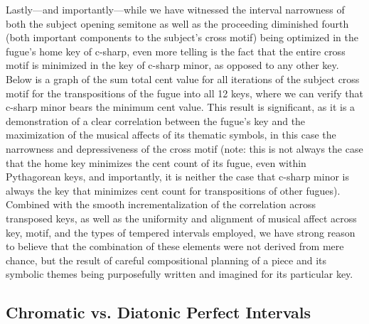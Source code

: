 Lastly---and importantly---while we have witnessed the interval
narrowness of both the subject opening semitone as well as the
proceeding diminished fourth (both important components to the subject's
cross motif) being optimized in the fugue's home key of c-sharp, even
more telling is the fact that the entire cross motif is minimized in the
key of c-sharp minor, as opposed to any other key. Below is a graph of
the sum total cent value for all iterations of the subject cross motif
for the transpositions of the fugue into all 12 keys, where we can
verify that c-sharp minor bears the minimum cent value. This result is
significant, as it is a demonstration of a clear correlation between the
fugue's key and the maximization of the musical affects of its thematic
symbols, in this case the narrowness and depressiveness of the cross
motif (note: this is not always the case that the home key minimizes the
cent count of its fugue, even within Pythagorean keys, and importantly,
it is neither the case that c-sharp minor is always the key that
minimizes cent count for transpositions of other fugues). Combined with
the smooth incrementalization of the correlation across transposed keys,
as well as the uniformity and alignment of musical affect across key,
motif, and the types of tempered intervals employed, we have strong
reason to believe that the combination of these elements were not
derived from mere chance, but the result of careful compositional
planning of a piece and its symbolic themes being purposefully written
and imagined for its particular key.



    \begin{center}
    \end{center}
    
    \subsection{Chromatic vs. Diatonic Perfect
Intervals}\label{chromatic-vs.-diatonic-perfect-intervals}

